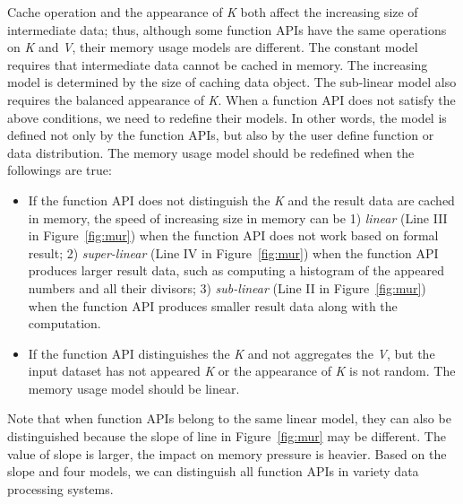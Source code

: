Cache operation and the appearance of \textit{K} both affect the increasing size of intermediate data; thus, although some function APIs have the same operations on \textit{K} and \textit{V}, their memory usage models are different. The constant model requires that intermediate data cannot be cached in memory. The increasing model is determined by the size of caching data object. The sub-linear model also requires the balanced appearance of \textit{K}. When a function API does not satisfy the above conditions, we need to redefine their models. In other words, the model is defined not only by the function APIs, but also by the user define function or data distribution. The memory usage model should be redefined when the followings are true:

\begin{itemize}

\item If the function API does not distinguish the \textit{K} and the result data are cached in memory, the speed of increasing size in memory can be 1) \textit{linear} (Line III in Figure~\ref{fig:mur}) when the function API does not work based on formal result; 2) \textit{super-linear} (Line IV in Figure~\ref{fig:mur}) when the function API produces larger result data, such as computing a histogram of the appeared numbers and all their divisors; 3) \textit{sub-linear} (Line II in Figure~\ref{fig:mur}) when the function API produces smaller result data along with the computation. 

\item If the function API distinguishes the \textit{K} and not aggregates the \textit{V}, but the input dataset has not appeared \textit{K} or the appearance of \textit{K} is not random. The memory usage model should be linear.

\end{itemize}

Note that when function APIs belong to the same linear model, they can also be distinguished because the slope of line in Figure~\ref{fig:mur} may be different. The value of slope is larger, the impact on memory pressure is heavier. Based on the slope and four models, we can distinguish all function APIs in variety data processing systems.


